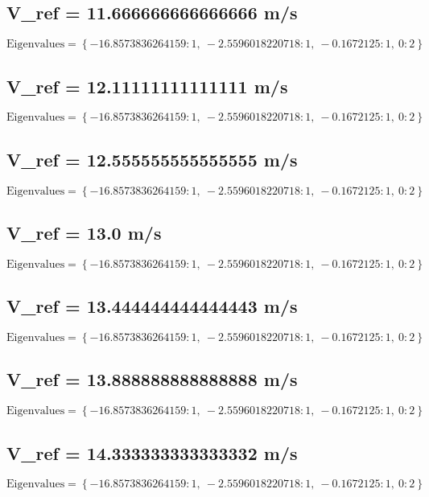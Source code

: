 \documentclass{article}
\begin{document}
\subsection*{V_ref = 11.666666666666666 m/s}
\begin{equation}
\text{Eigenvalues} = \left\{ -16.8573836264159 : 1, \  -2.5596018220718 : 1, \  -0.1672125 : 1, \  0 : 2\right\}
\end{equation}
\subsection*{V_ref = 12.11111111111111 m/s}
\begin{equation}
\text{Eigenvalues} = \left\{ -16.8573836264159 : 1, \  -2.5596018220718 : 1, \  -0.1672125 : 1, \  0 : 2\right\}
\end{equation}
\subsection*{V_ref = 12.555555555555555 m/s}
\begin{equation}
\text{Eigenvalues} = \left\{ -16.8573836264159 : 1, \  -2.5596018220718 : 1, \  -0.1672125 : 1, \  0 : 2\right\}
\end{equation}
\subsection*{V_ref = 13.0 m/s}
\begin{equation}
\text{Eigenvalues} = \left\{ -16.8573836264159 : 1, \  -2.5596018220718 : 1, \  -0.1672125 : 1, \  0 : 2\right\}
\end{equation}
\subsection*{V_ref = 13.444444444444443 m/s}
\begin{equation}
\text{Eigenvalues} = \left\{ -16.8573836264159 : 1, \  -2.5596018220718 : 1, \  -0.1672125 : 1, \  0 : 2\right\}
\end{equation}
\subsection*{V_ref = 13.888888888888888 m/s}
\begin{equation}
\text{Eigenvalues} = \left\{ -16.8573836264159 : 1, \  -2.5596018220718 : 1, \  -0.1672125 : 1, \  0 : 2\right\}
\end{equation}
\subsection*{V_ref = 14.333333333333332 m/s}
\begin{equation}
\text{Eigenvalues} = \left\{ -16.8573836264159 : 1, \  -2.5596018220718 : 1, \  -0.1672125 : 1, \  0 : 2\right\}
\end{equation}
\end{document}
